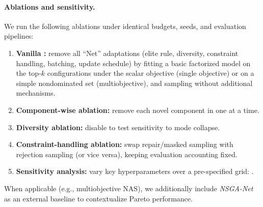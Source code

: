 \paragraph{Ablations and sensitivity.}
We run the following ablations under identical budgets, seeds, and evaluation pipelines:
\begin{enumerate}
    \item \textbf{Vanilla \BackboneName{}:} remove all \ProposedMethodName{} ``Net'' adaptations (elite rule, diversity, constraint handling,
    batching, update schedule) by fitting a basic factorized model on the top-\(k\) configurations under the scalar objective (single objective)
    or on a simple nondominated set (multiobjective), and sampling without additional mechanisms.
    \item \textbf{Component-wise ablation:} remove each novel component in \NoveltyDetails{} one at a time.
    \item \textbf{Diversity ablation:} disable \PThreeDiversityRule{} to test sensitivity to mode collapse.
    \item \textbf{Constraint-handling ablation:} swap repair/masked sampling with rejection sampling (or vice versa), keeping evaluation accounting fixed.
    \item \textbf{Sensitivity analysis:} vary key \ProposedMethodName{} hyperparameters over a pre-specified grid:
    \HPOHyperparameters{}.
\end{enumerate}
When applicable (e.g., multiobjective NAS), we additionally include \emph{NSGA-Net} as an external baseline to contextualize Pareto performance.
